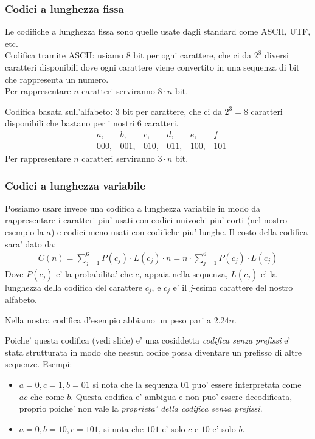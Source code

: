\documentclass{article}
\begin{document}
\subsubsection{Codici a lunghezza fissa}

Le codifiche a lunghezza fissa sono quelle usate dagli standard come ASCII, UTF, etc. \\

Codifica tramite ASCII: usiamo $8$ bit per ogni carattere, che ci da $2^8$
diversi caratteri disponibili dove ogni carattere viene convertito in una
sequenza di bit che rappresenta un numero. \\
Per rappresentare $n$ caratteri serviranno $8 \cdot n$ bit.

Codifica basata sull'alfabeto: $3$ bit per carattere, che ci da $2^3=8$ caratteri
disponibili che bastano per i nostri 6 caratteri.
\begin{align*}
  &a, &b, &c, &d, &e, &f \\
  &000, &001, &010, &011, &100, &101
\end{align*}
Per rappresentare $n$ caratteri serviranno $3 \cdot n$ bit.

\subsubsection{Codici a lunghezza variabile}

Possiamo usare invece una codifica a lunghezza variabile in modo da rappresentare
i caratteri piu' usati con codici univochi piu' corti (nel nostro esempio la $a$)
e codici meno usati con codifiche piu' lunghe. Il costo della codifica sara' dato da:
\begin{align*}
  C(n) = \sum_{j=1}^{6} P(c_j) \cdot L(c_j) \cdot n = n \cdot \sum_{j=1}^{6} P(c_j) \cdot L(c_j)
\end{align*}
Dove $P(c_j)$ e' la probabilita' che $c_j$ appaia nella sequenza, $L(c_j)$ e' la
lunghezza della codifica del carattere $c_j$, e $c_j$ e' il $j$-esimo carattere
del nostro alfabeto.

Nella nostra codifica d'esempio abbiamo un peso pari a $2.24n$.

Poiche' questa codifica (vedi slide) e' una cosiddetta \emph{codifica senza prefissi}
e' stata strutturata in modo che nessun codice possa diventare un prefisso di
altre sequenze. Esempi:
\begin{itemize}
  \item $a = 0, c = 1, b = 01$ si nota che la sequenza $01$ puo' essere interpretata
    come $ac$ che come $b$. Questa codifica e' ambigua e non puo' essere decodificata,
    proprio poiche' non vale la \emph{proprieta' della codifica senza prefissi}.
  \item $a = 0, b = 10, c = 101$, si nota che $101$ e' solo $c$ e $10$ e' solo $b$.
\end{itemize}
\end{document}
